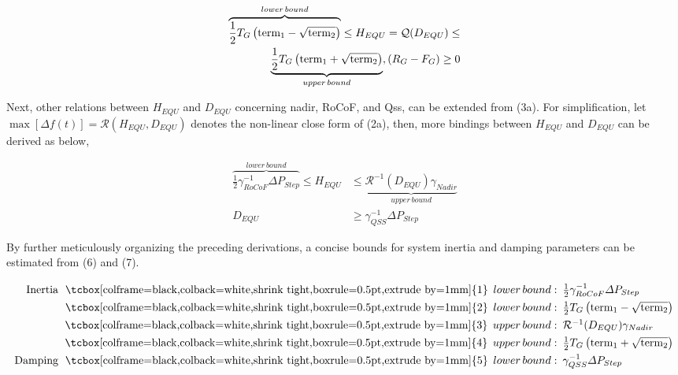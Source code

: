 \documentclass[lettersize,journal]{IEEEtran}
\newcommand{\ciao}[1]{{\setlength\fboxrule{0pt}\fbox{\tcbox[colframe=black,colback=white,shrink tight,boxrule=0.5pt,extrude by=1mm]{\small #1}}}}
\begin{document}
\begin{subequations}
  \begin{align}
    \overbrace{\frac{1}{2}T_G \left(\text{term}_1 - \sqrt{\text{term}_2} \right)}^{lower\,bound} \leq H_{EQU}=\mathcal{Q} (D_{EQU}) \leq \notag \\
    \underbrace{\frac{1}{2}T_G \left(\text{term}_1 + \sqrt{\text{term}_2} \right)}_{upper\, bound}, (R_G - F_G) \geq 0
    \end{align}
  \end{subequations}

Next, other relations between $H_{EQU}$ and $D_{EQU}$ concerning nadir, RoCoF, and Qss, can be extended from (3a). For simplification, let $\max [ \varDelta f(t)]=\mathcal{R} (H_{EQU}, D_{EQU})$ denotes the non-linear close form of (2a), then, more bindings between $H_{EQU}$ and $D_{EQU}$ can be derived as below,

\begin{subequations}
  \begin{align}
\overbrace{\frac{1}{2} \gamma_{RoCoF}^{-1} \varDelta P_{Step}}^{lower\, bound} \leq H_{EQU} &\leq \underbrace{\mathcal{R}^{-1}(D_{EQU}) \gamma_{Nadir}}_{upper\, bound} \\
D_{EQU} & \geq \gamma_{QSS}^{-1} \varDelta P_{Step}
  \end{align}
\end{subequations}

By further meticulously organizing the preceding derivations, a concise bounds for system inertia and damping parameters can be estimated from (6) and (7).

\begin{subequations}
  \begin{align}
    \!\!\!\begin{array}{rl}
    \text{Inertia}\,\, \ciao{1}\, lower\,bound:&\!\!\!\frac{1}{2} \gamma_{RoCoF}^{-1} \varDelta P_{Step}\\
    \ciao{2}\,lower\,bound:&\!\!\!\frac{1}{2}T_G \left(\text{term}_1 - \sqrt{\text{term}_2} \right)\\
    \ciao{3}\,upper\,bound:&\!\!\!\mathcal{R}^{-1}(D_{EQU}) \gamma_{Nadir} \\
    \ciao{4}\,upper\,bound:&\!\!\!\frac{1}{2}T_G \left(\text{term}_1 + \sqrt{\text{term}_2} \right)\\    
   \text{ Damping} \,\,\ciao{5}\,lower\,bound:&\!\!\! \gamma_{QSS}^{-1} \varDelta P_{Step}\\ 
    \end{array}
  \end{align}
\end{subequations}
\end{document}
